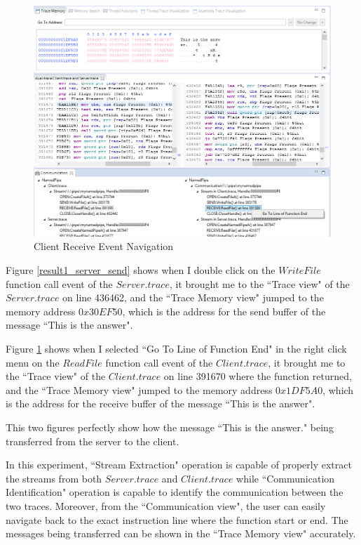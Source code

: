 \begin{figure}[H]
\centerline{\includegraphics[scale=0.4]{Figures/result1_client_read}}
 \caption{Client Receive Event Navigation}
\label{result1_client_read}
\end{figure}

Figure \ref{result1_server_send} shows when I double click on the $WriteFile$ function call event of the $Server.trace$, it brought me to the ``Trace view" of the $Server.trace$ on line 436462, and the ``Trace Memory view" jumped to the memory address $0x30EF50$, which is the address for the send buffer of the message ``This is the answer".

Figure \ref{result1_client_read} shows when I selected ``Go To Line of Function End" in the right click menu on the $ReadFile$ function call event of the $Client.trace$, it brought me to the ``Trace view" of the $Client.trace$ on line 391670 where the function returned, and the ``Trace Memory view" jumped to the memory address $0x1DF5A0$, which is the address for the receive buffer of the message ``This is the answer".

This two figures perfectly show how the message ``This is the answer." being transferred from the server to the client.

In this experiment, ``Stream Extraction" operation is capable of properly extract the streams from both $Server.trace$ and $Client.trace$ while ``Communication Identification" operation is capable to identify the communication between the two traces. Moreover, from the ``Communication view", the user can easily navigate back to the exact instruction line where the function start or end. The messages being transferred can be shown in the ``Trace Memory view" accurately.



